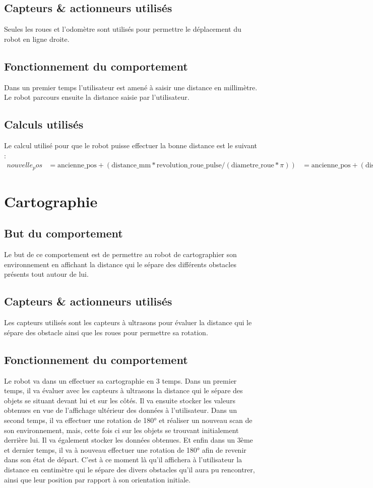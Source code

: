 \documentclass[11pt]{article} %
\begin{document}
        \subsection{Capteurs \& actionneurs utilisés}
		Seules les roues et l'odomètre sont utilisés pour permettre le déplacement du robot en ligne droite.
        \subsection{Fonctionnement du comportement}
		Dans un premier temps l'utilisateur est amené à saisir une distance en millimètre. Le robot parcours ensuite la distance saisie par l'utilisateur.
        \subsection{Calculs utilisés}
		Le calcul utilisé pour que le robot puisse effectuer la bonne distance est le suivant :
		\begin{align*}
			nouvelle_pos &= \text{ancienne\_pos} + (\text{distance\_mm} * \text{revolution\_roue\_pulse} / (\text{diametre\_roue} * \pi))
                   		     &= \text{ancienne\_pos} + (\text{distance\_mm} * 19456 / (42 * \pi) )
		\end{align*}
\pagebreak	
\section{Cartographie}
        	\subsection{But du comportement}
			Le but de ce comportement est de permettre au robot de cartographier son environnement en affichant la distance qui le sépare des différents obstacles présents tout autour de lui.
        	\subsection{Capteurs \& actionneurs utilisés}
			Les capteurs utilisés sont les capteurs à ultrasons pour évaluer la distance qui le sépare des obstacle ainsi que les roues pour permettre sa rotation.
        	\subsection{Fonctionnement du comportement}
			Le robot va dans un effectuer sa cartographie en 3 temps. Dans un premier temps, il va évaluer avec les capteurs à ultrasons la distance qui le sépare des objets se situant devant lui et sur les côtés. Il va ensuite stocker les valeurs obtenues en vue de l'affichage ultérieur des données à l'utilisateur. Dans un second temps, il va effectuer une rotation de 180° et réaliser un nouveau scan de son environnement, mais, cette fois ci sur les objets se trouvant initialement derrière lui. Il va également stocker les données obtenues. Et enfin dans un 3ème et dernier temps, il va à nouveau effectuer une rotation de 180° afin de revenir dans son état de départ. C'est à ce moment là qu'il affichera à l'utilisateur la distance en centimètre qui le sépare des divers obstacles qu'il aura pu rencontrer, ainsi que leur position par rapport à son orientation initiale. 
\end{document}
